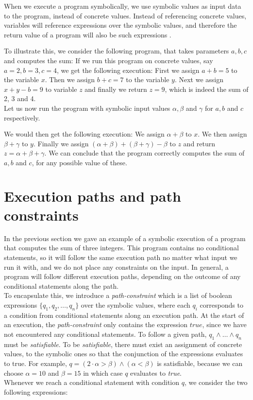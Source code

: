 	\fi   
	
	When we execute a program symbolically, we use symbolic values as input data to the program, instead of concrete values. Instead of referencing concrete values, variables will reference expressions over the symbolic values, and therefore the return value of a program will also be such expressions \cite{CadarSen13}.
	
	
	
	To illustrate this, we consider the following program, that takes parameters $a, b, c$ and computes the sum:
	\sumprogram{}
	If we run this program on concrete values, say $a = 2, b = 3, c = 4$, we get the following execution:
	First we assign $a+b = 5$ to the variable $x$. Then we assign $b + c = 7$ to the variable $y$. Next we assign $x + y - b = 9$ to variable $z$ and finally we return $z = 9$, which is indeed the sum of 2, 3 and 4. 
	\\
	Let us now run the program with symbolic input values $\alpha, \beta$ and $\gamma$ for $a, b$ and $c$ respectively. 

	
	We would then get the following execution: We assign $\alpha + \beta$ to $x$. We then assign $\beta + \gamma$ to $y$. Finally we assign $(\alpha + \beta) + (\beta + \gamma) - \beta$ to $z$ and return $z = \alpha + \beta + \gamma$. We can conclude that the program correctly computes the sum of $a, b$ and $c$, for any possible value of these.
	
\section{Execution paths and path constraints}
		In the previous section we gave an example of a symbolic execution of a program that computes the sum of three integers. This program contains no conditional statements, so it will follow the same execution path no matter what input we run it with, and we do not place any constraints on the input. In general, a program will follow different execution paths, depending on the outcome of any conditional statements along the path. 
		\\
		To encapsulate this, we introduce a \emph{path-constraint} which is a list of boolean expressions $\{q_1, q_2, \ldots, q_n \}$ over the symbolic values, where each $q_i$ corresponds to a condition from conditional statements along an execution path. At the start of an execution, the \emph{path-constraint} only contains the expression $true$, since we have not encountered any conditional statements. To follow a given path, $q_1 \land \ldots \land q_n$ must be \emph{satisfiable}. To be \emph{satisfiable}, there must exist an assignment of concrete values, to the symbolic ones so that the conjunction of the expressions evaluates to true. For example, $q = (2\cdot \alpha > \beta) \land (\alpha < \beta)$ is satisfiable, because we can choose $\alpha = 10$ and $\beta = 15$ in which case $q$ evaluates to \emph{true}.
		\\ 
		Whenever we reach a conditional statement with condition $q$, we consider the two following expressions:
		

